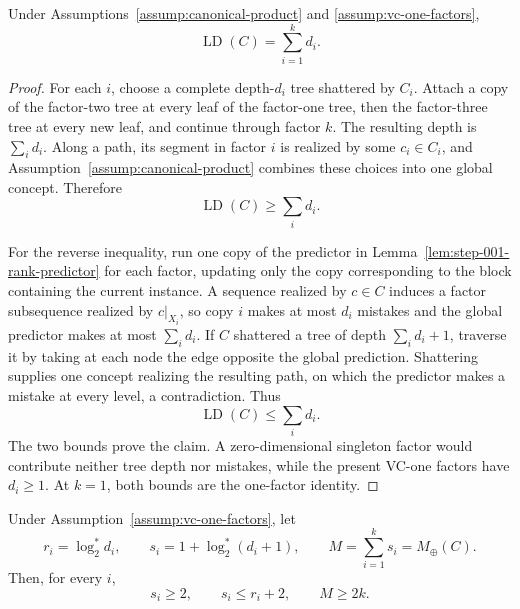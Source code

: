 \begin{proposition}
\label{prop:step-001-product-littlestone}
Under Assumptions~\ref{assump:canonical-product} and
\ref{assump:vc-one-factors},
\[
\operatorname{LD}(C)=\sum_{i=1}^k d_i.
\]
\end{proposition}

\begin{proof}
For each \(i\), choose a complete depth-\(d_i\) tree shattered by \(C_i\).
Attach a copy of the factor-two tree at every leaf of the factor-one tree,
then the factor-three tree at every new leaf, and continue through factor
\(k\).  The resulting depth is \(\sum_i d_i\).  Along a path, its segment
in factor \(i\) is realized by some \(c_i\in C_i\), and
Assumption~\ref{assump:canonical-product} combines these choices into one
global concept.  Therefore
\begin{equation}\label{eq:step-001-ld-lower}
\operatorname{LD}(C)\ge\sum_i d_i.
\end{equation}

For the reverse inequality, run one copy of the predictor in
Lemma~\ref{lem:step-001-rank-predictor} for each factor, updating only the
copy corresponding to the block containing the current instance.  A
sequence realized by \(c\in C\) induces a factor subsequence realized by
\(c|_{X_i}\), so copy \(i\) makes at most \(d_i\) mistakes and the global
predictor makes at most \(\sum_i d_i\).  If \(C\) shattered a tree of depth
\(\sum_i d_i+1\), traverse it by taking at each node the edge opposite the
global prediction.  Shattering supplies one concept realizing the resulting
path, on which the predictor makes a mistake at every level, a contradiction.
Thus
\begin{equation}\label{eq:step-001-ld-upper}
\operatorname{LD}(C)\le\sum_i d_i.
\end{equation}
The two bounds prove the claim.  A zero-dimensional singleton factor would
contribute neither tree depth nor mistakes, while the present VC-one factors
have \(d_i\ge1\).  At \(k=1\), both bounds are the one-factor identity.
\end{proof}

\begin{lemma}
\label{lem:step-001-logstar}
Under Assumption~\ref{assump:vc-one-factors}, let
\[
r_i=\log_2^*d_i,\qquad
s_i=1+\log_2^*(d_i+1),\qquad
M=\sum_{i=1}^k s_i=M_{\oplus}(C).
\]
Then, for every \(i\),
\[
s_i\ge2,\qquad s_i\le r_i+2,\qquad M\ge2k.
\]
\end{lemma}


